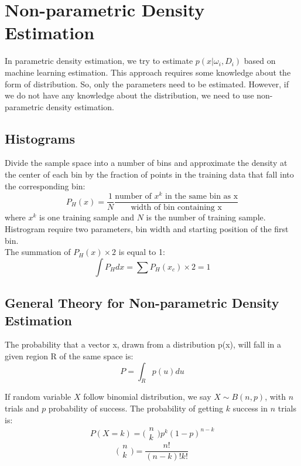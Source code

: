 \chapter{Non-parametric Density Estimation}

\begin{multicols*}{2}
\noindent In parametric density estimation, we try to estimate $p(x|\omega_i, D_i)$ based on machine learning estimation. This approach requires some knowledge about the form of distribution. So, only the parameters need to be estimated. However, if we do not have any knowledge about the distribution, we need to use non-parametric density estimation. 

\section{Histograms}

\noindent Divide the sample space into a number of bins and approximate the density at the center of each bin by the fraction of points in the training data that fall into the corresponding bin:
$$P_H(x) = \frac{1}{N} \frac{\text{number of } x^k \text{ in the same bin as x}}{\text{width of bin containing x}}$$
\noindent where $x^k$ is one training sample and $N$ is the number of training sample. \\

\noindent Histrogram require two parameters, bin width and starting position of the first bin. \\

\noindent The summation of $P_H(x) \times 2$ is equal to 1:
$$\int P_H dx = \sum P_H(x_c) \times 2 = 1$$ 
\section{General Theory for Non-parametric Density Estimation}

\noindent The probability that a vector x, drawn from a distribution p(x), will fall in a given region R of the same space is:
$$P=\int_R p(u) du$$

\noindent If random variable $X$ follow binomial distribution, we say $X \sim B(n, p)$, with $n$ trials and $p$ probability of success. The probability of getting $k$ success in $n$ trials is:
$$P(X=k) = \bigg( \begin{matrix} n \\ k \end{matrix}\bigg) p^k (1-p)^{n-k}$$
$$\bigg( \begin{matrix} n \\ k \end{matrix}\bigg) = \frac{n!}{(n-k)!k!}$$


\end{multicols*}
